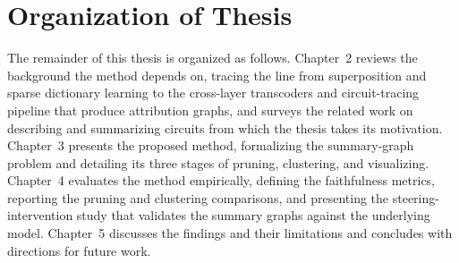 \documentclass[../main.tex]{subfiles}
\begin{document}
\section{Organization of Thesis}
The remainder of this thesis is organized as follows. Chapter~2 reviews the background the
method depends on, tracing the line from superposition and sparse dictionary learning to the
cross-layer transcoders and circuit-tracing pipeline that produce attribution graphs, and
surveys the related work on describing and summarizing circuits from which the thesis takes
its motivation. Chapter~3 presents the proposed method, formalizing the summary-graph
problem and detailing its three stages of pruning, clustering, and visualizing. Chapter~4
evaluates the method empirically, defining the faithfulness metrics, reporting the pruning
and clustering comparisons, and presenting the steering-intervention study that validates
the summary graphs against the underlying model. Chapter~5 discusses the findings and
their limitations and concludes with directions for future work.
\end{document}
